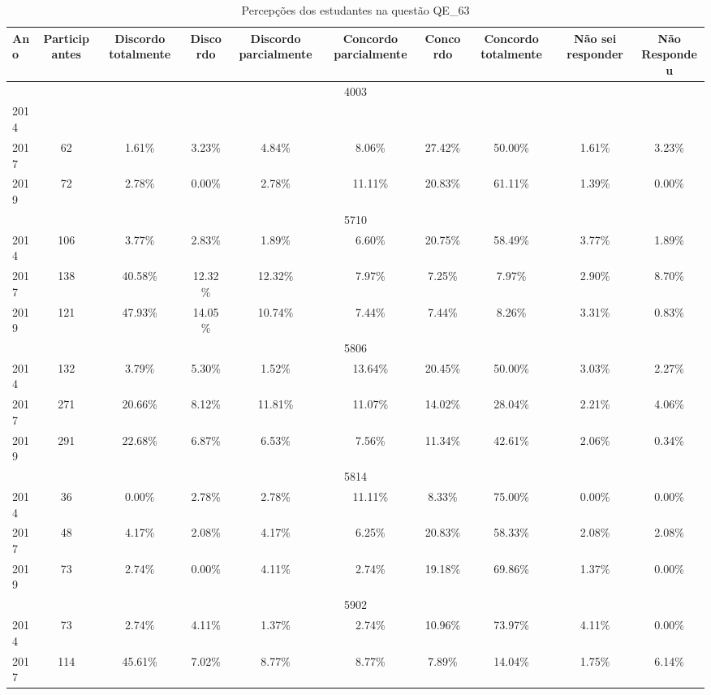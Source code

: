 \begin{table}[H]
\centering
\caption{Percepções dos estudantes na questão QE\_63}
\begin{tabular}{|l|c|ccc|ccc|cc|}
\hline
\toprule
Ano & Participantes & Discordo totalmente & Discordo & Discordo parcialmente & Concordo parcialmente & Concordo & Concordo totalmente & Não sei responder & Não Respondeu \\
\midrule
\hline
\multicolumn{10}{|c|}{4003}\\
\hline
2014 & & & & & & & & & \\
2017 & 62 & 1.61\% & 3.23\% & 4.84\% & 8.06\% & 27.42\% & 50.00\% & 1.61\% & 3.23\%\\
2019 & 72 & 2.78\% & 0.00\% & 2.78\% & 11.11\% & 20.83\% & 61.11\% & 1.39\% & 0.00\%\\
\hline
\hline
\multicolumn{10}{|c|}{5710}\\
\hline
2014 & 106 & 3.77\% & 2.83\% & 1.89\% & 6.60\% & 20.75\% & 58.49\% & 3.77\% & 1.89\%\\
2017 & 138 & 40.58\% & 12.32\% & 12.32\% & 7.97\% & 7.25\% & 7.97\% & 2.90\% & 8.70\%\\
2019 & 121 & 47.93\% & 14.05\% & 10.74\% & 7.44\% & 7.44\% & 8.26\% & 3.31\% & 0.83\%\\
\hline
\hline
\multicolumn{10}{|c|}{5806}\\
\hline
2014 & 132 & 3.79\% & 5.30\% & 1.52\% & 13.64\% & 20.45\% & 50.00\% & 3.03\% & 2.27\%\\
2017 & 271 & 20.66\% & 8.12\% & 11.81\% & 11.07\% & 14.02\% & 28.04\% & 2.21\% & 4.06\%\\
2019 & 291 & 22.68\% & 6.87\% & 6.53\% & 7.56\% & 11.34\% & 42.61\% & 2.06\% & 0.34\%\\
\hline
\hline
\multicolumn{10}{|c|}{5814}\\
\hline
2014 & 36 & 0.00\% & 2.78\% & 2.78\% & 11.11\% & 8.33\% & 75.00\% & 0.00\% & 0.00\%\\
2017 & 48 & 4.17\% & 2.08\% & 4.17\% & 6.25\% & 20.83\% & 58.33\% & 2.08\% & 2.08\%\\
2019 & 73 & 2.74\% & 0.00\% & 4.11\% & 2.74\% & 19.18\% & 69.86\% & 1.37\% & 0.00\%\\
\hline
\hline
\multicolumn{10}{|c|}{5902}\\
\hline
2014 & 73 & 2.74\% & 4.11\% & 1.37\% & 2.74\% & 10.96\% & 73.97\% & 4.11\% & 0.00\%\\
2017 & 114 & 45.61\% & 7.02\% & 8.77\% & 8.77\% & 7.89\% & 14.04\% & 1.75\% & 6.14\%\\

\end{tabular}
\end{table}

